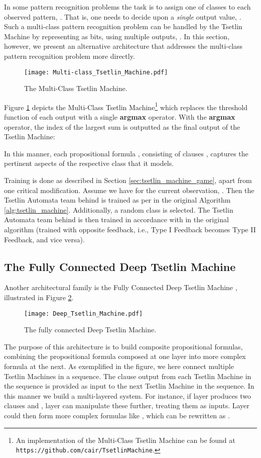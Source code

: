 \documentclass[11pt,a4paper]{article}
\begin{document}
In some pattern recognition problems the task is to assign one of  classes to each observed pattern, . That is, one needs to decide upon a \emph{single} output value, . Such a multi-class pattern recognition problem can be handled by the Tsetlin Machine by representing  as bits, using multiple outputs, . In this section, however, we present an alternative architecture that addresses the multi-class pattern recognition problem more directly.

\begin{figure}[!th]
\centering
\texttt{[image: Multi-class\_Tsetlin\_Machine.pdf]}
\caption{The Multi-Class Tsetlin Machine.}
\label{figure:multi-class_tsetlin_machine}
\end{figure}

Figure \ref{figure:multi-class_tsetlin_machine} depicts the Multi-Class Tsetlin Machine\footnote{An implementation of the Multi-Class Tsetlin Machine can be found at {\tt https://github.com/cair/TsetlinMachine}.} which replaces the threshold function of each output  with a single {\bf argmax} operator. With the {\bf argmax} operator, the index  of the largest sum  is outputted as the final output of the Tsetlin Machine:

In this manner, each propositional formula , consisting of clauses , captures the pertinent aspects of the respective class  that it models. 

Training is done as described in Section \ref{sec:tsetlin_machine_game}, apart from one critical modification. Assume we have  for the current observation, . Then the Tsetlin Automata team behind  is trained as per  in the original Algorithm \ref{alg:tsetlin_machine}. Additionally, a random class  is selected. The Tsetlin Automata team behind  is then trained in accordance with  in the original algorithm (trained with opposite feedback, i.e., Type I Feedback becomes Type II Feedback, and vice versa).

\subsection{The Fully Connected Deep Tsetlin Machine}

Another architectural family is the Fully Connected Deep Tsetlin Machine \cite{Granmo2018b}, illustrated in Figure \ref{figure:deep_tsetlin_machine}. 
\begin{figure}[!th]
\centering
\texttt{[image: Deep\_Tsetlin\_Machine.pdf]}
\caption{The fully connected Deep Tsetlin Machine.}
\label{figure:deep_tsetlin_machine}
\end{figure}
The purpose of this architecture is to build composite propositional formulas, combining the propositional formula composed at one layer into more complex formula at the next. As exemplified in the figure, we here connect multiple Tsetlin Machines in a sequence. The clause output from  each Tsetlin Machine in the sequence is provided as input to the next Tsetlin Machine in the sequence. In this manner we build a multi-layered system.  For instance, if layer  produces two clauses  and , layer  can manipulate these further, treating them as inputs. Layer  could then form more complex formulas like , which can be rewritten as .
\end{document}
